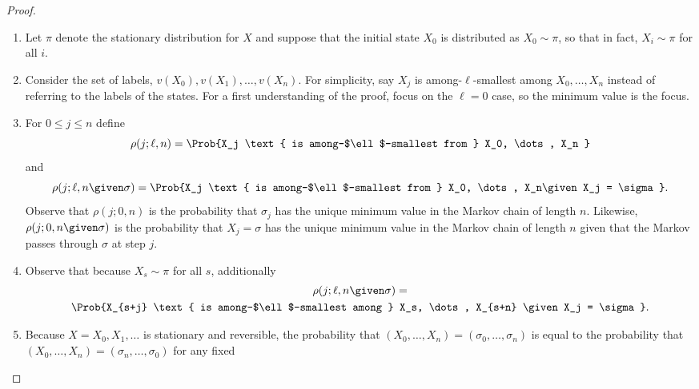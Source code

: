 \documentclass[12pt]{article}
\begin{document}
\begin{proof}
    \begin{enumerate}
        \item
            Let \( \pi \) denote the stationary distribution for \( X \)
            and suppose that the initial state \( X_0 \) is distributed
            as \( X_0 \sim \pi \), so that in fact, \( X_i \sim \pi \)
            for all \( i \).
        \item
            Consider the set of labels, \( v(X_0), v(X_1), \dots, v(X_n)
            \).  For simplicity, say \( X_j \) is among-\( \ell \)-smallest
            among \( X_0, \dots, X_n \) instead of referring to the
            labels of the states. For a first understanding of the
            proof, focus on the \( \ell = 0 \) case, so the minimum
            value is the focus.
        \item
            For \( 0 \le j \le n \)
            define
            \[
              \rho(j; \ell, n) = \Prob{X_j \text{ is
                  among-$\ell$-smallest from } X_0, \dots, X_n }
            \] and
            \[
                \rho(j; \ell, n \given \sigma) = \Prob{X_j \text{ is
                among-$\ell$-smallest from } X_0, \dots, X_n%
                \given X_j = \sigma }.
            \] Observe that \( \rho(j; 0 ,n) \) is the probability that \(
            \sigma_j \) has the unique minimum value in the Markov chain
            of length \( n \).  Likewise, \( \rho(j; 0, n \given \sigma)
            \) is the probability that \( X_j = \sigma \) has the unique
            minimum value in the Markov chain of length \( n \) given
            that the Markov passes through \( \sigma \) at step \( j \).
        \item
            Observe that because \( X_s \sim \pi \) for all \( s \),
            additionally
            \begin{multline*}
              \rho(j; \ell, n \given \sigma) =\\
              \Prob{X_{s+j} \text{ is
                among-$\ell$-smallest among } X_s, \dots, X_{s+n}
              \given X_j = \sigma }.
            \end{multline*}
        \item\label{enum:significance:basethm5} 
            Because \( X = X_0 , X_1, \dots \) is stationary and
            reversible, the probability that \( (X_0, \dots, X_n ) = (\sigma_0,
            \dots , \sigma_n ) \) is equal to the probability that \( (X_0,\dots,
            X_n ) = (\sigma_n, \dots, \sigma_0) \) for any fixed

\end{enumerate}
\end{proof}
\end{document}
